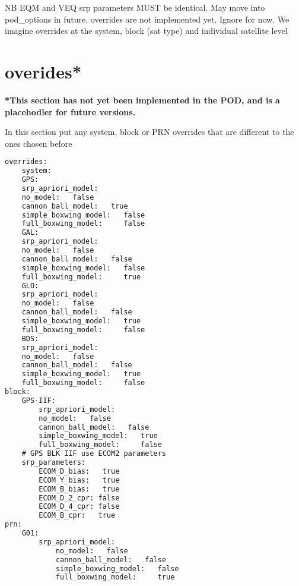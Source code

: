 NB EQM and VEQ srp parameters MUST be identical. May move into pod\_options in future.
overrides are not implemented yet. Ignore for now. We imagine overrides at the system, block (sat type) and individual satellite level


\section{overides*}
\textbf{*This section has not yet been implemented in the POD, and is a placehodler for future versions.}

In this section put any system, block or PRN overrides that are different to the ones chosen before
{\small
	\begin{lstlisting}[language=xml,caption=yaml example for override]
overrides:
	system:
	GPS:
	srp_apriori_model:
	no_model:   false
	cannon_ball_model:   true
	simple_boxwing_model:   false
	full_boxwing_model:     false
	GAL:
	srp_apriori_model:
	no_model:   false
	cannon_ball_model:   false
	simple_boxwing_model:   false
	full_boxwing_model:     true
	GLO:
	srp_apriori_model:
	no_model:   false
	cannon_ball_model:   false
	simple_boxwing_model:   true
	full_boxwing_model:     false
	BDS:
	srp_apriori_model:
	no_model:   false
	cannon_ball_model:   false
	simple_boxwing_model:   true
	full_boxwing_model:     false
block:
	GPS-IIF:
		srp_apriori_model:
		no_model:   false
		cannon_ball_model:   false
		simple_boxwing_model:   true
		full_boxwing_model:     false
	# GPS BLK IIF use ECOM2 parameters
	srp_parameters:
		ECOM_D_bias:   true
		ECOM_Y_bias:   true
		ECOM_B_bias:   true
		ECOM_D_2_cpr: false
		ECOM_D_4_cpr: false
		ECOM_B_cpr:   true
prn:
	G01:
		srp_apriori_model:
			no_model:   false
			cannon_ball_model:   false
			simple_boxwing_model:   false
			full_boxwing_model:     true
	

	\end{lstlisting}
}

